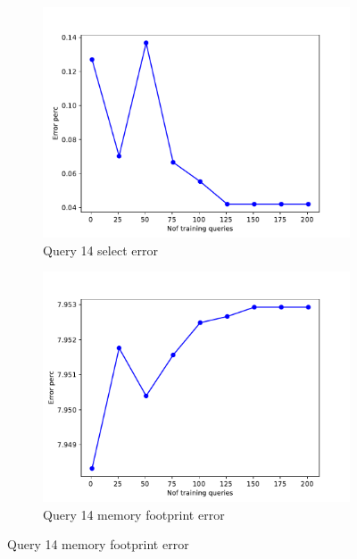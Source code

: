 \begin{figure}[!htb]
   \begin{subfigure}[t]{0.5\textwidth}
     \includegraphics[scale=0.4]{figs/tpch10/tpch10_sel14_error.pdf}
     \caption{Query 14 select error}
     \label{fig:tpch_sel14}
    \end{subfigure}
    \begin{subfigure}[t]{0.5\textwidth}
      \includegraphics[scale=0.4]{figs/tpch10/tpch10_q14_memerror.pdf}
      \caption{Query 14 memory footprint error}
      \label{fig:tpch_mem14}
    \end{subfigure}
\end{figure}

